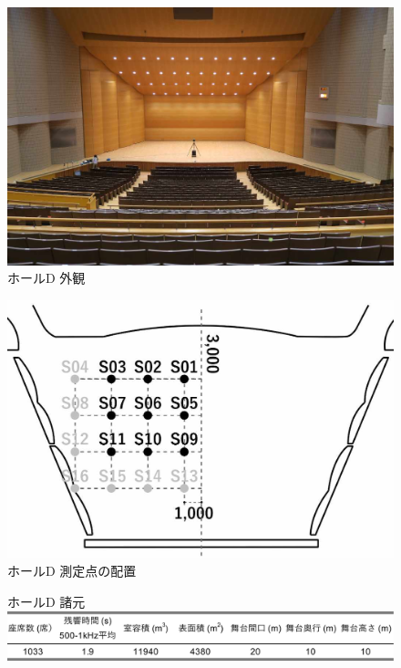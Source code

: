 \documentclass[11pt,a4j]{jreport}
\begin{document}
  \begin{figure}[H]
    \begin{minipage}{.5\linewidth} %
      \centering
      \includegraphics[width=.7\linewidth]{images/measuredHalls/resized/picture_d.jpg}
      \\ホールD 外観
    \end{minipage}%
    \begin{minipage}{.5\linewidth} %
      \centering
      \includegraphics[width=.7\linewidth]{images/measuredHalls/resized/flat_d.jpg}
      \\ホールD 測定点の配置
    \end{minipage}

    \begin{minipage}{1\linewidth}
      \centering
      ホールD 諸元\\
      \includegraphics[width=.8\linewidth]{images/measuredHalls/informationTable/d.pdf}
    \end{minipage}
  \end{figure}
\end{document}
